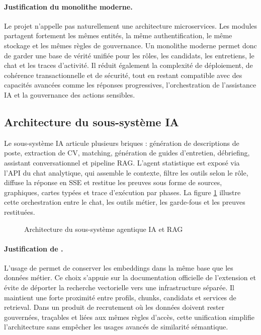 \paragraph{Justification du monolithe moderne.}
Le projet n'appelle pas naturellement une architecture microservices. Les modules partagent fortement les mêmes entités, la même authentification, le même stockage et les mêmes règles de gouvernance. Un monolithe moderne permet donc de garder une base de vérité unifiée pour les rôles, les candidats, les entretiens, le chat et les traces d'activité. Il réduit également la complexité de déploiement, de cohérence transactionnelle et de sécurité, tout en restant compatible avec des capacités avancées comme les réponses progressives, l'orchestration de l'assistance IA et la gouvernance des actions sensibles.

\subsection{Architecture du sous-système IA}
Le sous-système IA articule plusieurs briques : génération de descriptions de poste, extraction de CV, matching, génération de guides d'entretien, débriefing, assistant conversationnel et pipeline RAG. L'agent statistique est exposé via l'API du chat analytique, qui assemble le contexte, filtre les outils selon le rôle, diffuse la réponse en SSE et restitue les preuves sous forme de sources, graphiques, cartes typées et trace d'exécution par phases.
La figure \ref{fig:ai-orchestration} illustre cette orchestration entre le chat, les outils métier, les garde-fous et les preuves restituées.

\begin{figure}[H]
  \centering
  \caption{\label{fig:ai-orchestration}Architecture du sous-système agentique IA et RAG}
\end{figure}

\paragraph{Justification de .}
L'usage de  permet de conserver les embeddings dans la même base que les données métier. Ce choix s'appuie sur la documentation officielle de l'extension   et évite de déporter la recherche vectorielle vers une infrastructure séparée. Il maintient une forte proximité entre profils, chunks, candidats et services de retrieval. Dans un produit de recrutement où les données doivent rester gouvernées, traçables et liées aux mêmes règles d'accès, cette unification simplifie l'architecture sans empêcher les usages avancés de similarité sémantique.

